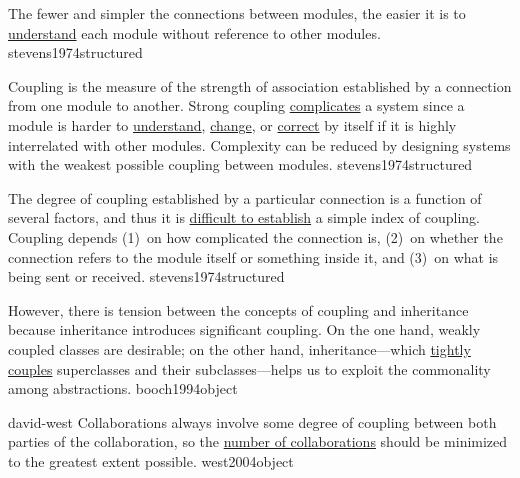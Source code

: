 \documentclass{article}
\begin{document}

  {The fewer and simpler the connections between modules, the easier it is to \ul{understand} each module without reference to other modules.}
  {stevens1974structured}


  {Coupling is the measure of the strength of association established by a connection from one module to another. Strong coupling \ul{complicates} a system since a module is harder to \ul{understand}, \ul{change}, or \ul{correct} by itself if it is highly interrelated with other modules. Complexity can be reduced by designing systems with the weakest possible coupling between modules.}
  {stevens1974structured}


  {The degree of coupling established by a particular connection is a function of several factors, and thus it is \ul{difficult to establish} a simple index of coupling. Coupling depends (1)~on how complicated the connection is, (2)~on whether the connection refers to the module itself or something inside it, and (3)~on what is being sent or received.}
  {stevens1974structured}


  {However, there is tension between the concepts of coupling and inheritance because inheritance introduces significant coupling. On the one hand, weakly coupled classes are desirable; on the other hand, inheritance---which \ul{tightly couples} superclasses and their subclasses---helps us to exploit the commonality among abstractions.}
  {booch1994object}

\lnQuote
  {david-west}
  {Collaborations always involve some degree of coupling between both parties of the collaboration, so the \ul{number of collaborations} should be minimized to the greatest extent possible.}
  {west2004object}
\end{document}
